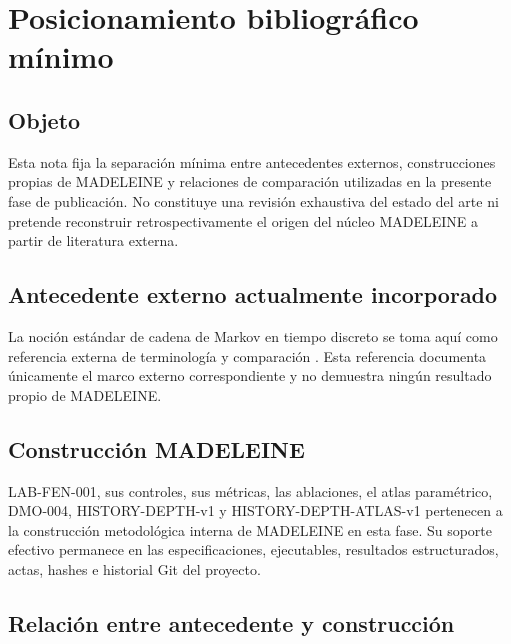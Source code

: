 \chapter*{Posicionamiento bibliográfico mínimo}

\section*{Objeto}

\begin{observation}
Esta nota fija la separación mínima entre antecedentes externos, construcciones propias de MADELEINE y relaciones de comparación utilizadas en la presente fase de publicación. No constituye una revisión exhaustiva del estado del arte ni pretende reconstruir retrospectivamente el origen del núcleo MADELEINE a partir de literatura externa.
\end{observation}

\section*{Antecedente externo actualmente incorporado}

\begin{observation}
La noción estándar de cadena de Markov en tiempo discreto se toma aquí como referencia externa de terminología y comparación \parencite{norris1997markov}. Esta referencia documenta únicamente el marco externo correspondiente y no demuestra ningún resultado propio de MADELEINE.
\end{observation}

\section*{Construcción MADELEINE}

\begin{observation}
LAB-FEN-001, sus controles, sus métricas, las ablaciones, el atlas paramétrico, DMO-004, HISTORY-DEPTH-v1 y HISTORY-DEPTH-ATLAS-v1 pertenecen a la construcción metodológica interna de MADELEINE en esta fase. Su soporte efectivo permanece en las especificaciones, ejecutables, resultados estructurados, actas, hashes e historial Git del proyecto.
\end{observation}

\section*{Relación entre antecedente y construcción}

